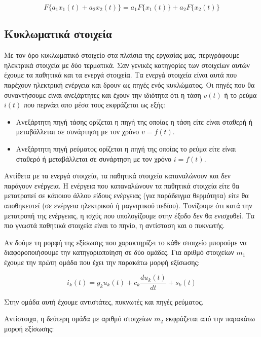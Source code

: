 \begin{equation}
    F\{a_1x_1(t) + a_2x_2(t)\} = a_1F\{x_1(t)\} + a_2F\{x_2(t)\}
\end{equation}


\subsection{Κυκλωματικά στοιχεία}

Με τον όρο κυκλωματικό στοιχείο στα πλαίσια της εργασίας μας, περιγράφουμε ηλεκτρικά στοιχεία με δύο τερματικά. Σαν γενικές κατηγορίες των στοιχείων αυτών έχουμε τα παθητικά και τα ενεργά στοιχεία. Τα ενεργά στοιχεία είναι αυτά που παρέχουν ηλεκτρική ενέργεια και δρουν ως πηγές ενός κυκλώματος. Οι πηγές που θα συναντήσουμε είναι ανεξάρτητες και έχουν την ιδιότητα ότι η τάση $v(t)$ ή το ρεύμα $i(t)$ που περνάει απο μέσα τους εκφράζεται ως εξής:
\begin{itemize}
    \item Ανεξάρτητη πηγή τάσης ορίζεται η πηγή της οποίας η τάση είτε είναι σταθερή ή μεταβάλλεται σε συνάρτηση με τον χρόνο $v = f(t)$. 
    \item Ανεξάρτητη πηγή ρεύματος ορίζεται η πηγή της οποίας το ρεύμα είτε είναι σταθερό ή μεταβάλλεται σε συνάρτηση με τον χρόνο $i = f(t)$.
\end{itemize}

Αντίθετα με τα ενεργά στοιχεία, τα παθητικά στοιχεία καταναλώνουν και δεν παράγουν ενέργεια. Η ενέργεια που καταναλώνουν τα παθητικά στοιχεία είτε θα μετατραπεί σε κάποιου άλλου είδους ενέργειας (για παράδειγμα θερμότητα) είτε θα αποθηκευτεί (σε ενέργεια ηλεκτρικού ή μαγνητικού πεδίου). Τονίζουμε ότι κατά την μετατροπή της ενέργειας, η ισχύς που υπολογίζουμε στην έξοδο δεν θα ενισχυθεί. Τα πιο γνωστά παθητικά στοιχεία είναι το πηνίο, η αντίσταση και ο πυκνωτής.

Αν δούμε τη μορφή της εξίσωσης που χαρακτηρίζει το κάθε στοιχείο μπορούμε να διαφοροποιήσουμε την κατηγοριοποίηση σε δύο ομάδες. Για αριθμό στοιχείων $m_1$ έχουμε την πρώτη ομάδα που έχει την παρακάτω μορφή εξίσωσης:

\begin{equation}
    i_k(t) = g_k u_k(t) + c_k \frac{du_k(t)}{dt} + s_k(t)
\end{equation}

Στην ομάδα αυτή έχουμε αντιστάτες, πυκνωτές και πηγές ρεύματος.

Αντίστοιχα, η δεύτερη ομάδα με αριθμό στοιχείων $m_2$ εκφράζεται από την παρακάτω μορφή εξίσωσης:

